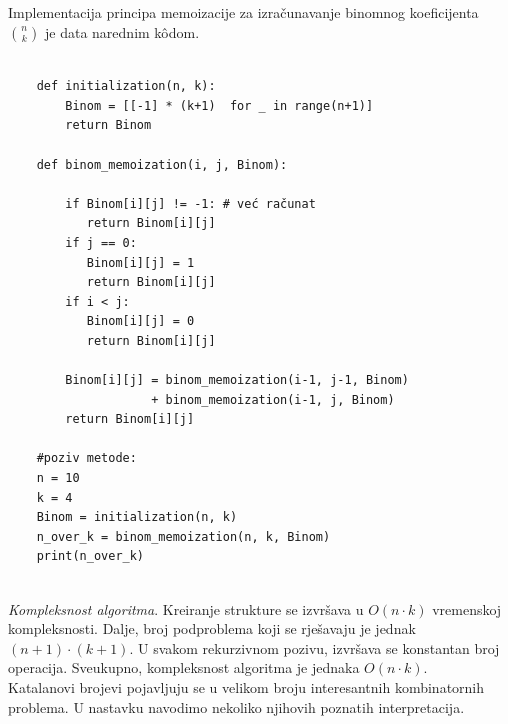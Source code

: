   Implementacija principa memoizacije za izračunavanje binomnog koefici\-jenta $\binom{n}{k}$ je data narednim k\^odom. 
  
  \begin{verbatim}
  	
  	def initialization(n, k):
  	    Binom = [[-1] * (k+1)  for _ in range(n+1)] 
  	    return Binom 
  	    
  	def binom_memoization(i, j, Binom): 
  	    
  	    if Binom[i][j] != -1: # već računat
  	       return Binom[i][j] 
  	    if j == 0: 
  	       Binom[i][j] = 1
  	       return Binom[i][j] 
  	    if i < j: 
  	       Binom[i][j] = 0 
  	       return Binom[i][j]
  	       
  	    Binom[i][j] = binom_memoization(i-1, j-1, Binom) 
  	                + binom_memoization(i-1, j, Binom) 
  	    return Binom[i][j]

    #poziv metode:
    n = 10
    k = 4
    Binom = initialization(n, k) 
    n_over_k = binom_memoization(n, k, Binom) 
    print(n_over_k)
    
  \end{verbatim}  
  
  \textit{Kompleksnost algoritma}.  Kreiranje strukture se izvršava u $O(n\cdot k)$ vremenskoj kompleksnosti. Dalje,  broj podproblema koji se rješavaju je jednak $(n+1) \cdot (k+1)$.  U svakom rekurzivnom pozivu, izvršava se konstantan broj operacija. Sveukupno, kompleksnost algoritma je jednaka $O(n \cdot k)$. \\
  
  
  
  
Katalanovi brojevi pojavljuju se u velikom broju interesantnih kombinatornih problema. U nastavku navodimo nekoliko njihovih poznatih interpretacija.

